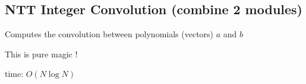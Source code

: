 \subsection{NTT Integer Convolution (combine 2 modules)}

Computes the convolution between polynomials (vectors) $a$ and $b$

This is pure magic !

time: $O(N \log{N})$
